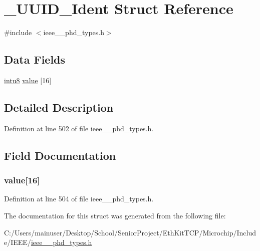 \hypertarget{struct___u_u_i_d___ident}{}\section{\+\_\+\+U\+U\+I\+D\+\_\+\+Ident Struct Reference}
\label{struct___u_u_i_d___ident}


{\ttfamily \#include $<$ieee\+\_\+\_\+phd\+\_\+types.\+h$>$}

\subsection*{Data Fields}
\begin{DoxyCompactItemize}
\item 
\hyperlink{ieee__11073__phd__types_8h_ae21d5428a584a153613cbe335630d3f4}{intu8} \hyperlink{struct___u_u_i_d___ident_a926f3b428e031f1a050781bceff63be8}{value} \mbox{[}16\mbox{]}
\end{DoxyCompactItemize}


\subsection{Detailed Description}


Definition at line 502 of file ieee\+\_\+\_\+phd\+\_\+types.\+h.



\subsection{Field Documentation}
\hypertarget{struct___u_u_i_d___ident_a926f3b428e031f1a050781bceff63be8}{}
\subsubsection[{value}]{ value\mbox{[}16\mbox{]}}\label{struct___u_u_i_d___ident_a926f3b428e031f1a050781bceff63be8}


Definition at line 504 of file ieee\+\_\+\_\+phd\+\_\+types.\+h.



The documentation for this struct was generated from the following file\+:\begin{DoxyCompactItemize}
\item 
C\+:/\+Users/mainuser/\+Desktop/\+School/\+Senior\+Project/\+Eth\+Kit\+T\+C\+P/\+Microchip/\+Include/\+I\+E\+E\+E/\hyperlink{ieee__11073__phd__types_8h}{ieee\+\_\+\_\+phd\+\_\+types.\+h}\end{DoxyCompactItemize}
